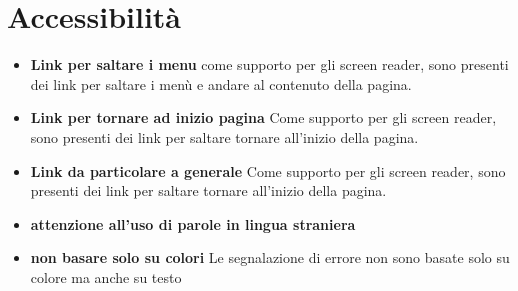 \documentclass[1_relazione.tex]{subfiles}
\begin{document}
\section{Accessibilit\`{a}}
\begin{itemize}
\item\textbf{Link per saltare i menu} come supporto per gli screen reader, sono presenti dei link per saltare i men\`{u} e andare al contenuto della pagina.

\item\textbf{Link per tornare ad inizio pagina} Come supporto per gli screen reader, sono presenti dei link per saltare tornare all'inizio della pagina.

\item\textbf{Link da particolare a generale} Come supporto per gli screen reader, sono presenti dei link per saltare tornare all'inizio della pagina.

\item\textbf{attenzione all'uso di parole in lingua straniera}

\item\textbf{non basare solo su colori} Le segnalazione di errore non sono basate solo su colore ma anche su testo
\end{itemize}
\end{document}
